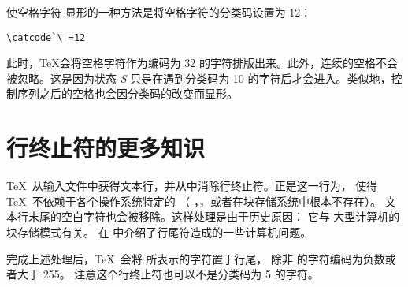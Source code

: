 \documentclass{book}
\begin{document}
使空格字符 \textvisiblespace 显形的一种方法是将空格字符的分类码设置为 12：
\begin{verbatim}
\catcode`\ =12
\end{verbatim}
此时，\TeX 会将空格字符作为编码为 32 的字符排版出来。此外，连续的空格不会被忽略。这是因为状态 {\itshape S} 只是在遇到分类码为 10 的字符后才会进入。类似地，控制序列之后的空格也会因分类码的改变而显形。

\section{行终止符的更多知识}

\TeX\ 从输入文件中获得文本行，并从中消除行终止符。正是这一行为，
使得 \TeX\ 不依赖于各个操作系统特定的%
（-，，或者在块存储系统中根本不存在）。
文本行末尾的空白字符也会被移除。这样处理是由于历史原因：
它与  大型计算机的块存储模式有关。
在 \cite{B:ctrl-M} 中介绍了行尾符造成的一些计算机问题。

完成上述处理后，\TeX\ 会将  所表示的字符置于行尾，
除非  的字符编码为负数或者大于 255。
注意这个行终止符也可以不是分类码为 5 的字符。
\end{document}
